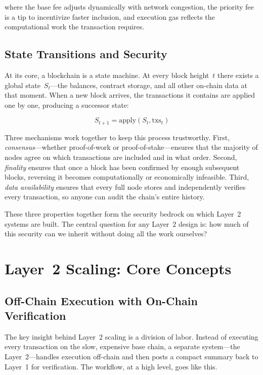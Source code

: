 \noindent where the base fee adjusts dynamically with network congestion, the priority fee is a tip to incentivize faster inclusion, and execution gas reflects the computational work the transaction requires.

\subsection{State Transitions and Security}

At its core, a blockchain is a state machine. At every block height~$t$ there exists a global state~$S_t$---the balances, contract storage, and all other on-chain data at that moment. When a new block arrives, the transactions it contains are applied one by one, producing a successor state:

\begin{equation}
S_{t+1} = \text{apply}(S_t, \text{txs}_t)
\end{equation}

Three mechanisms work together to keep this process trustworthy. First, \textit{consensus}---whether proof-of-work or proof-of-stake---ensures that the majority of nodes agree on which transactions are included and in what order. Second, \textit{finality} ensures that once a block has been confirmed by enough subsequent blocks, reversing it becomes computationally or economically infeasible. Third, \textit{data availability} ensures that every full node stores and independently verifies every transaction, so anyone can audit the chain's entire history.

These three properties together form the security bedrock on which Layer~2 systems are built. The central question for any Layer~2 design is: how much of this security can we inherit without doing all the work ourselves?

\section{Layer~2 Scaling: Core Concepts}

\subsection{Off-Chain Execution with On-Chain Verification}

The key insight behind Layer~2 scaling is a division of labor. Instead of executing every transaction on the slow, expensive base chain, a separate system---the Layer~2---handles execution off-chain and then posts a compact summary back to Layer~1 for verification. The workflow, at a high level, goes like this.


